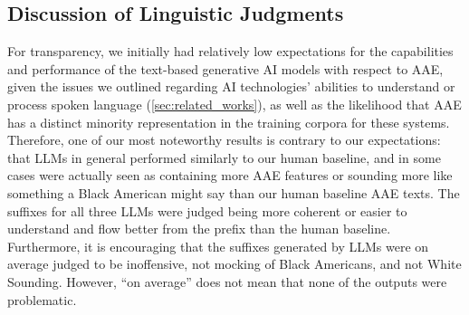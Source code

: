 \subsection{Discussion of Linguistic Judgments}

For transparency, we initially had relatively low expectations for the capabilities and performance of the text-based generative AI models with respect to AAE, given the issues we outlined regarding AI technologies' abilities to understand or process spoken language (\autoref{sec:related_works}), as well as the likelihood that AAE has a distinct minority representation in the training corpora for these systems. Therefore, one of our most noteworthy results is contrary to our expectations: that LLMs in general performed similarly to our human baseline, and in some cases were actually seen as containing more AAE features or sounding more like something a Black American might say than our human baseline AAE texts. The suffixes for all three LLMs were judged being more coherent or easier to understand and flow better from the prefix than the human baseline. Furthermore, it is encouraging that the suffixes generated by LLMs were on average judged to be inoffensive, not mocking of Black Americans, and not White Sounding. However, ``on average'' does not mean that none of the outputs were problematic. 

